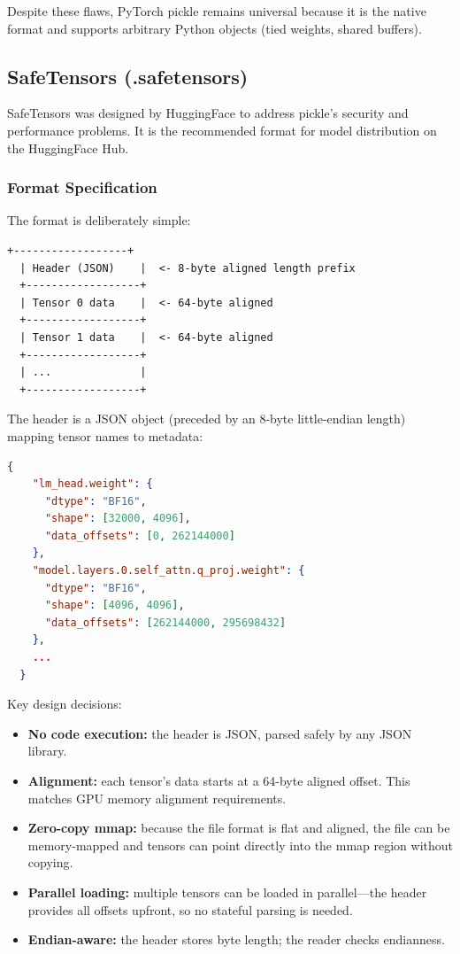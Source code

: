 \documentclass[11pt,a4paper]{article}
\theoremstyle{definition}
\begin{document}
Despite these flaws, PyTorch pickle remains universal because it is the native format and supports arbitrary Python objects (tied weights, shared buffers).

\subsection{SafeTensors (.safetensors)}

SafeTensors was designed by HuggingFace to address pickle's security and performance problems. It is the recommended format for model distribution on the HuggingFace Hub.

\subsubsection{Format Specification}

The format is deliberately simple:

\begin{lstlisting}[caption=SafeTensors binary layout]
  +------------------+
  | Header (JSON)    |  <- 8-byte aligned length prefix
  +------------------+
  | Tensor 0 data    |  <- 64-byte aligned
  +------------------+
  | Tensor 1 data    |  <- 64-byte aligned
  +------------------+
  | ...              |
  +------------------+
\end{lstlisting}

The header is a JSON object (preceded by an 8-byte little-endian length) mapping tensor names to metadata:

\begin{lstlisting}[caption=SafeTensors header structure, language=Json]
  {
    "lm_head.weight": {
      "dtype": "BF16",
      "shape": [32000, 4096],
      "data_offsets": [0, 262144000]
    },
    "model.layers.0.self_attn.q_proj.weight": {
      "dtype": "BF16",
      "shape": [4096, 4096],
      "data_offsets": [262144000, 295698432]
    },
    ...
  }
\end{lstlisting}

Key design decisions:
\begin{itemize}
	\item \textbf{No code execution:} the header is JSON, parsed safely by any JSON library.
	\item \textbf{Alignment:} each tensor's data starts at a 64-byte aligned offset. This matches GPU memory alignment requirements.
	\item \textbf{Zero-copy mmap:} because the file format is flat and aligned, the file can be memory-mapped and tensors can point directly into the mmap region without copying.
	\item \textbf{Parallel loading:} multiple tensors can be loaded in parallel---the header provides all offsets upfront, so no stateful parsing is needed.
	\item \textbf{Endian-aware:} the header stores byte length; the reader checks endianness.
\end{itemize}
\end{document}
